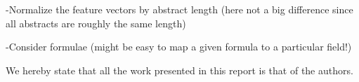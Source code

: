 \documentclass{acm_proc_article-sp}
\begin{document}
-Normalize the feature vectors by abstract length (here not a big difference since all abstracts are roughly the same length)

-Consider formulae (might be easy to map a given formula to a particular field!)



We hereby state that all the work presented in this report is that of the authors.

%


%
%
\end{document}
